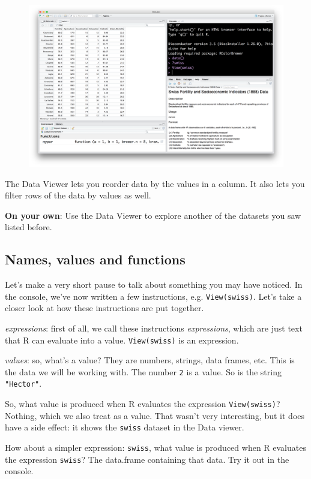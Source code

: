 \documentclass[]{book}
\theoremstyle{definition}
\theoremstyle{definition}
\theoremstyle{remark}
\begin{document}
\begin{figure}
\centering
\includegraphics{img/rstudio_view_swiss.png}
\caption{}
\end{figure}

The Data Viewer lets you reorder data by the values in a column. It also
lets you filter rows of the data by values as well.

\textbf{On your own}: Use the Data Viewer to explore another of the
datasets you saw listed before.

\subsection{Names, values and
functions}\label{names-values-and-functions}

Let's make a very short pause to talk about something you may have
noticed. In the console, we've now written a few instructions, e.g.
\texttt{View(swiss)}. Let's take a closer look at how these instructions
are put together.

\emph{expressions}: first of all, we call these instructions
\emph{expressions}, which are just text that R can evaluate into a
value. \texttt{View(swiss)} is an expression.

\emph{values}: so, what's a value? They are numbers, strings, data
frames, etc. This is the data we will be working with. The number
\texttt{2} is a value. So is the string \texttt{"Hector"}.

So, what value is produced when R evaluates the expression
\texttt{View(swiss)}? Nothing, which we also treat as a value. That
wasn't very interesting, but it does have a side effect: it shows the
\texttt{swiss} dataset in the Data viewer.

How about a simpler expression: \texttt{swiss}, what value is produced
when R evaluates the expression \texttt{swiss}? The data.frame
containing that data. Try it out in the console.
\end{document}
